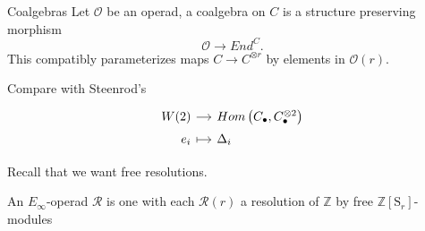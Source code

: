 \documentclass[10pt,t, handout]{beamer} %
\renewcommand{\S}{\mathrm{S}}
\begin{document}
\begin{frame}[fragile]{Coalgebras}
	Let $\mathcal O$ be an operad, a coalgebra on $C$ is a structure preserving morphism
	\begin{equation*}
	\mathcal O \to End^C.
	\end{equation*}
	This compatibly parameterizes maps $C \to C^{\otimes r}$ by elements in $\mathcal O(r)$.
	
	\pause \vspace*{10pt}
	
	Compare with Steenrod's
	\vspace*{-2pt}
	\begin{equation*}
	\begin{tikzcd}[%
	row sep=tiny,
	column sep = small,
	,row sep = 0ex
	,/tikz/column 1/.append style={anchor=base east}
	,/tikz/column 2/.append style={anchor=base west}
	]
	W(2) \arrow[r] & Hom\left(C_\bullet, C_\bullet^{\otimes 2}\right) \\
	e_i \arrow[r, |->] & \Delta_i
	\end{tikzcd}
	\end{equation*}
	
	\pause
	Recall that we want free resolutions.

	\pause

	\begin{definition}
		An $E_\infty$-operad $\mathcal R$ is one with each $\mathcal R(r)$ a resolution of $\mathbb Z$ by free $\mathbb Z[\S_r]$-modules
	\end{definition}
\end{frame}
\end{document}
